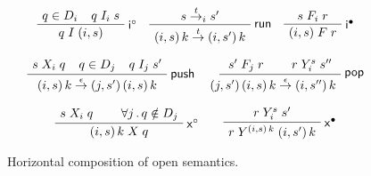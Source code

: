 \documentclass[sigplan,10pt,review]{acmart}
\newcommand{\figsize}{\small}
\newcommand{\kw}[1]{\ensuremath{ \mathsf{#1} }}
\newcommand{\que}{\circ}
\newcommand{\ans}{\bullet}
\begin{document}
\begin{figure} %
  \figsize
    \begin{gather*}
        \AxiomC{$q \in D_i$}
        \AxiomC{\hspace{-1.5em} $q \mathrel{I_i} s$}
        \RightLabel{$\kw{i}^\que$}
        \BinaryInfC{$q \mathrel{I} (i, s)$}
        \DisplayProof
        \quad
        \AxiomC{$s \stackrel{t}{\rightarrow}_i s'$}
        \RightLabel{$\kw{run}$}
        \UnaryInfC{$
            (i, s) \, k
            \stackrel{t}{\rightarrow}
            (i, s') \, k$}
        \DisplayProof
        \quad
        \AxiomC{$s \mathrel{F_i} r$}
        \RightLabel{$\kw{i}^\ans$}
        \UnaryInfC{$(i, s) \mathrel{F} r$}
        \DisplayProof
        \\[0.8em]
        \AxiomC{$s \mathrel{X_i} q$}
        \AxiomC{\hspace{-1.5em} $q \in D_j$}
        \AxiomC{\hspace{-1.5em} $q \mathrel{I_j} s'$}
        \RightLabel{$\kw{push}$}
        \TrinaryInfC{$
            (i, s) \, k
            \stackrel{\epsilon}{\rightarrow}
            (j, s') \, (i, s) \, k$}
        \DisplayProof
        \qquad
        \AxiomC{$s' \mathrel{F_j} r$}
        \AxiomC{$r \mathrel{Y_i^s} s''$}
        \RightLabel{$\kw{pop}$}
        \BinaryInfC{\hspace{-1.5em} $
            (j, s') \, (i, s) \, k
            \stackrel{\epsilon}{\rightarrow}
            (i, s'') \, k$}
        \DisplayProof
        \\[0.8em]
        \AxiomC{$s \mathrel{X_i} q$}
        \AxiomC{$\forall j \,.\, q \notin D_j$}
        \RightLabel{$\kw{x}^\que$}
        \BinaryInfC{$(i, s) \, k \mathrel{X} q$}
        \DisplayProof
        \qquad
        \AxiomC{$r \mathrel{Y_i^s} s'$}
        \RightLabel{$\kw{x}^\ans$}
        \UnaryInfC{$r \mathrel{Y^{(i, s) \, k}} (i, s') \, k$}
        \DisplayProof
    \end{gather*}
    \caption{Horizontal composition of open semantics.
    }
    \label{fig:hcomp}
\end{figure}
\end{document}
